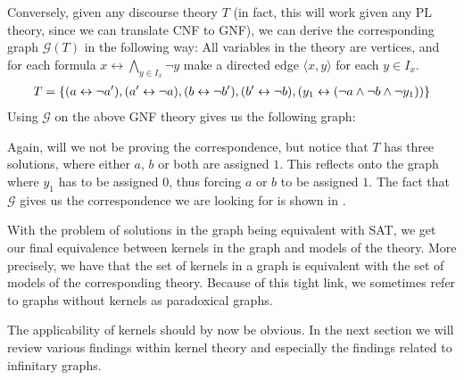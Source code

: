 Conversely, given any discourse theory $T$ (in fact, this will work given any PL theory, since we can translate CNF to GNF), we can derive the corresponding graph $\mathcal{G}(T)$ in the following way:
All variables in the theory are vertices, and for each formula $x \leftrightarrow \bigwedge_{y \in I_x} \neg y$ make a directed edge $\langle x,y \rangle$ for each $y \in I_x$.
  \begin{align}
    T = \{ ( a \leftrightarrow \neg a'), (a' \leftrightarrow \neg a), (b \leftrightarrow \neg b'), (b' \leftrightarrow \neg b), (y_1 \leftrightarrow (\neg a \wedge \neg b \wedge \neg y_1)) \}
  \end{align}
  Using $\mathcal{G}$ on the above GNF theory gives us the following graph:\par
  \begin{figure}[!h]
    \centering
    \caption{}
    \label{ex:graph_from_theory}
\end{figure}
Again, will we not be proving the correspondence, but notice that $T$ has three solutions, where either $a$, $b$ or both are assigned $1$.
This reflects onto the graph where $y_1$ has to be assigned $0$, thus forcing $a$ or $b$ to be assigned $1$.
The fact that $\mathcal{G}$ gives us the correspondence we are looking for is shown in \cite{apal-digraph}.

With the problem of solutions in the graph being equivalent with SAT, we get our final equivalence between kernels in the graph and models of the theory.
More precisely, we have that the set of kernels in a graph is equivalent with the set of models of the corresponding theory.
Because of this tight link, we sometimes refer to graphs without kernels as paradoxical graphs.

The applicability of kernels should by now be obvious.
In the next section we will review various findings within kernel theory and especially the findings related to infinitary graphs.
